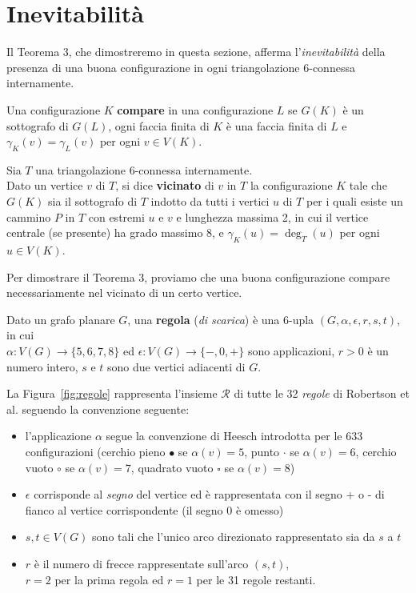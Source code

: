 \documentclass[a4paper,12pt,titlepage]{report}
\begin{document}
    \section{Inevitabilità}
    Il Teorema 3, che dimostreremo in questa sezione, afferma l'\emph{inevitabilità} della presenza di una buona configurazione in ogni triangolazione 6-connessa internamente.
    \begin{dfn}
    	Una configurazione $K$ {\bfseries compare} in una configurazione $L$ se $G(K)$ è un sottografo di $G(L)$, ogni faccia finita di $K$ è una faccia finita di $L$ e $\gamma_K(v) = \gamma_L(v)$ per ogni $v \in V(K)$.
    \end{dfn}
    \begin{dfn}
    	Sia $T$ una triangolazione 6-connessa internamente.
    	\\Dato un vertice $v$ di $T$, si dice {\bfseries vicinato} di $v$ in $T$ la configurazione $K$ tale che $G(K)$ sia il sottografo di $T$ indotto da tutti i vertici $u$ di $T$ per i quali esiste un cammino $P$ in $T$ con estremi $u$ e $v$ e lunghezza massima 2, in cui il vertice centrale (se presente) ha grado massimo 8, e $\gamma_K(u) = \deg_T(u)$ per ogni $u \in V(K)$.    	
    \end{dfn}
    Per dimostrare il Teorema 3, proviamo che una buona configurazione compare necessariamente nel vicinato di un certo vertice.
    \begin{dfn}
    	Dato un grafo planare $G$, una {\bfseries regola} (\emph{di scarica}) è una 6-upla $(G, \alpha, \epsilon, r, s, t)$, in cui 
    	\\$\alpha \colon V(G) \to \{5, 6, 7, 8\}$ ed $\epsilon \colon V(G) \to \{-, 0, +\}$ sono applicazioni, $r > 0$ è un numero intero, $s$ e $t$ sono due vertici adiacenti di $G$.
    \end{dfn}
    La Figura~\ref{fig:regole} rappresenta l'insieme $\mathcal{R}$ di tutte le 32 \emph{regole} di Robertson et al. seguendo la convenzione seguente:
    \begin{itemize}
    	\item  l'applicazione $\alpha$ segue la convenzione di Heesch introdotta per le 633 configurazioni (cerchio pieno $\bullet$ se $\alpha(v) = 5$, punto $\cdot$ se $\alpha(v) = 6$, cerchio vuoto $\circ$ se $\alpha(v) = 7$, quadrato vuoto $\square$ se $\alpha(v) = 8$)
    	\item $\epsilon$ corrisponde al \emph{segno} del vertice ed è rappresentata con il segno + o - di fianco al vertice corrispondente (il segno 0 è omesso)
    	\item $s, t \in V(G)$ sono tali che l'unico arco direzionato rappresentato sia da $s$ a $t$
    	\item $r$ è il numero di frecce rappresentate sull'arco $(s, t)$, \\$r = 2$ per la prima regola ed $r = 1$ per le 31 regole restanti.
    \end{itemize}
\end{document}
